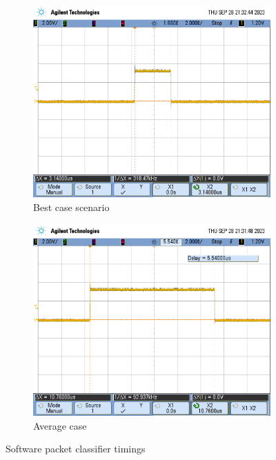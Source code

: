 \begin{figure}[h]
    \centering
    \begin{subfigure}[b]{0.45\textwidth} %
        \includegraphics[width=\textwidth]{Images/sw_pf_best_case.png}
        \caption{Best case scenario}
        \label{fig:sw_pf_best_case}
    \end{subfigure}
    \hfill %
    \begin{subfigure}[b]{0.45\textwidth} %
        \includegraphics[width=\textwidth]{Images/sw_pf_bad_case.png}
        \caption{Average case}
        \label{fig:sw_pf_bad_case}
    \end{subfigure}
    \caption{Software packet classifier timings}
    \label{fig:sw_pf_timings}
\end{figure}


